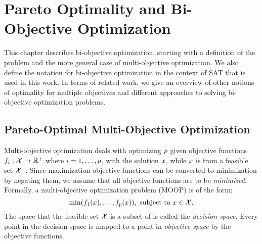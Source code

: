\chapter{Pareto Optimality and Bi-Objective Optimization\label{chap:biobjective-optimization}}

This chapter describes bi-objective optimization, starting with a definition of the problem and the more general case of multi-objective optimization.
We also define the notation for bi-objective optimization in the context of SAT that is used in this work.
In terms of related work, we give an overview of other notions of optimality for multiple objectives and different approaches to solving bi-objective optimization problems.

\section{Pareto-Optimal Multi-Objective Optimization\label{sec:multiopt}}

Multi-objective optimization deals with optimizing $p$ given objective functions $f_i: \mathcal{X} \rightarrow \mathbb{R}^+$ where $i=1,\dots,p$, with the solution $x$, while $x$ is from a feasible set $\mathcal{X}$~\autocite{Ehrgott2005-1}.
Since maximization objective functions can be converted to minimization by negating them, we assume that all objective functions are to be \emph{minimized}.
Formally, a multi-objective optimization problem (MOOP) is of the form:
\begin{equation}\label{eq:moop}
  \min (f_1(x),\dots,f_p(x)),\ \text{subject to}\ x\in \mathcal{X}.
\end{equation}
The space that the feasible set $\mathcal{X}$ is a subset of is called the \emph{decision space}.
Every point in the decision space is mapped to a point in \emph{objective space} by the objective functions.

